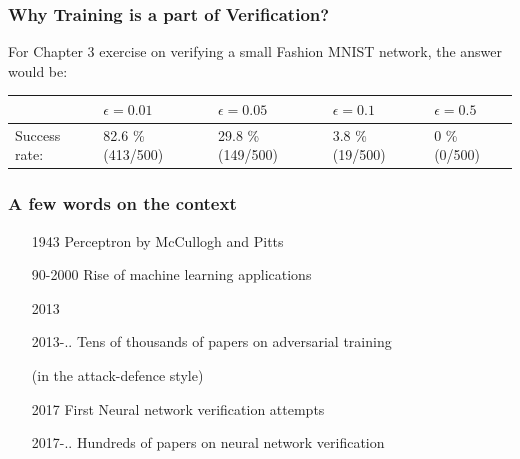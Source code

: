 \documentclass[aspectratio=169]{beamer}
\begin{document}
   \begin{frame}
\frametitle{Why Training is a part of Verification?}

For Chapter 3 exercise on verifying a small Fashion MNIST network, the answer would be:

\footnotesize{
\begin{tabular}{|p{}|p{}|p{}|p{}| p{}|}
		\hline
& 	$\epsilon = 0.01$ & $\epsilon = 0.05$ & $\epsilon = 0.1$ & $\epsilon = 0.5$ \\ \hline \hline

Success rate: & 82.6 \% (413/500) &	29.8 \% (149/500) &	3.8 \% (19/500) & 	0 \% (0/500)\\		
		 \hline
	\end{tabular}}


\end{frame}

\begin{frame}
  \frametitle{A few words on the context}

  \begin{itemize}
  \item[1943] Perceptron by McCullogh and Pitts
  \item[90-2000] Rise of machine learning applications
  \item[2013]
   {\scriptsize
 \begin{thebibliography}{99}
 \beamertemplatearticlebibitems
\end{thebibliography}}

\item[2013-..] Tens of thousands of papers on adversarial training

  (in the attack-defence style)
    {\scriptsize
 \begin{thebibliography}{99}
   \beamertemplatearticlebibitems
\end{thebibliography}}

\pause

\item[2017] First Neural network verification attempts
    {\scriptsize
 \begin{thebibliography}{99}
   \beamertemplatearticlebibitems
\end{thebibliography}}


\item[2017-..] Hundreds of papers on neural network verification

  \end{itemize}
\end{frame}
\end{document}
